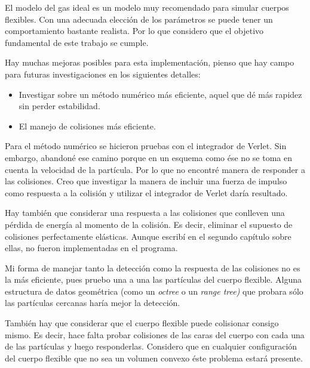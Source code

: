 El modelo del gas ideal es un modelo muy recomendado para simular cuerpos flexibles.
Con una adecuada elección de los parámetros se puede tener un comportamiento bastante realista.
Por lo que considero que el objetivo fundamental de este trabajo se cumple.

Hay muchas mejoras posibles para esta implementación, pienso que hay campo para futuras investigaciones en los siguientes detalles:

\begin{itemize}
 \item Investigar sobre un método numérico más eficiente, aquel que dé más rapidez sin perder estabilidad.
 \item El manejo de colisiones más eficiente.
\end{itemize}

Para el método numérico se hicieron pruebas con el integrador de Verlet.
Sin embargo, abandoné ese camino porque en un esquema como ése no se toma en cuenta la velocidad de la partícula.
Por lo que no encontré manera de responder a las colisiones.
Creo que investigar la manera de incluir una fuerza de impulso como respuesta a la colisión y utilizar el integrador de Verlet daría resultado.

Hay también que considerar una respuesta a las colisiones que conlleven una pérdida de energía al momento de la colisión.
Es decir, eliminar el supuesto de colisiones perfectamente elásticas.
Aunque escribí en el segundo capítulo sobre ellas, no fueron implementadas en el programa.

Mi forma de manejar tanto la detección como la respuesta de las colisiones  no es la más eficiente, pues pruebo una a una las partículas del cuerpo flexible.
Alguna estructura de datos geométrica (como un \emph{\textenglish{octree}} o un \emph{\textenglish{range tree})} que probara sólo las partículas cercanas haría mejor la detección.

También hay que considerar que el cuerpo flexible puede colisionar consigo mismo.
Es decir, hace falta probar colisiones de las caras del cuerpo con cada una de las partículas y luego responderlas.
Considero que en cualquier configuración del cuerpo flexible que no sea un volumen convexo éste problema estará presente.
